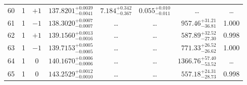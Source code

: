 \begin{table*}[!]
\begin{tabular}{llcrrlrc}
60 & 1 & $+1$ & $    137.8201_{-      0.0041}^{+      0.0039}$ & $       7.184_{-       0.367}^{+       0.342}$ & $       0.055_{-       0.011}^{+       0.010}$ & \multicolumn{1}{c}{\dots} & \dots \\[1pt] 
61 & 1 & $-1$ & $    138.3020_{-      0.0007}^{+      0.0007}$ & \multicolumn{1}{c}{\dots} & \multicolumn{1}{c}{\dots} & $      957.46_{-       36.81}^{+       31.21}$ & 1.000 \\[1pt]
62 & 1 & $+1$ & $    139.1560_{-      0.0016}^{+      0.0013}$ & \multicolumn{1}{c}{\dots} & \multicolumn{1}{c}{\dots} & $      587.89_{-       27.30}^{+       32.52}$ & 0.998 \\[1pt]
63 & 1 & $-1$ & $    139.7153_{-      0.0005}^{+      0.0005}$ & \multicolumn{1}{c}{\dots} & \multicolumn{1}{c}{\dots} & $      771.33_{-       26.62}^{+       26.52}$ & 1.000 \\[1pt]
64 & 1 & 0 & $    140.1670_{-      0.0006}^{+      0.0006}$ & \multicolumn{1}{c}{\dots} & \multicolumn{1}{c}{\dots} & $     1366.76_{-       53.52}^{+       57.40}$ & \dots \\[1pt]
65 & 1 & 0 & $    143.2529_{-      0.0010}^{+      0.0012}$ & \multicolumn{1}{c}{\dots} & \multicolumn{1}{c}{\dots} & $      557.18_{-       28.73}^{+       24.31}$ & 0.998 \\[1pt]


\end{tabular}
\end{table*}
